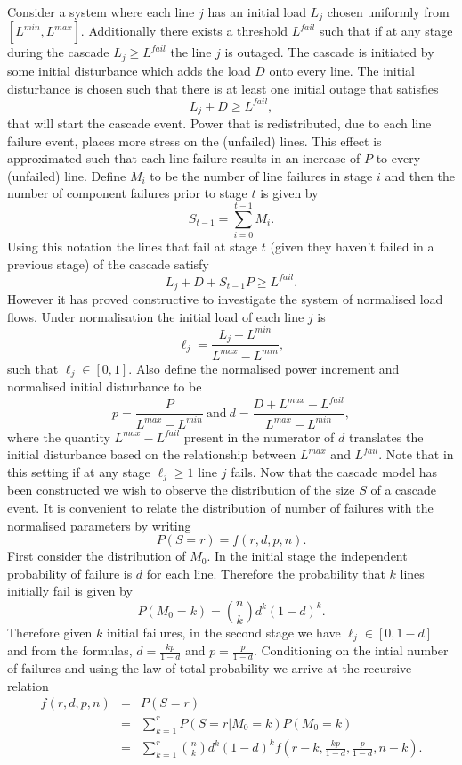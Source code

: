 \documentclass{article}
\renewcommand{\l}{\ell}
\begin{document}
Consider a system where each line $j$ has an initial load $L_j$ chosen uniformly from $[L^{min}, L^{max}]$. Additionally there exists a threshold $L^{fail}$ such that if at any stage during the cascade $L_j\ge L^{fail}$ the line $j$ is outaged. The cascade is initiated by some initial disturbance which adds the load $D$ onto every line. The initial disturbance is chosen such that there is at least one initial outage that satisfies
\[ L_j + D \ge L^{fail},\]
that will start the cascade event. Power that is redistributed, due to each line failure event, places more stress on the (unfailed) lines. This effect is approximated such that each line failure results in an increase of $P$ to every (unfailed) line. Define $M_i$ to be the number of line failures in stage $i$ and then the number of component failures prior to stage $t$ is given by
\[S_{t-1} = \sum_{i=0}^{t-1} M_i.\]
Using this notation the lines that fail at stage $t$ (given they haven't failed in a previous stage) of the cascade satisfy
\[ L_j+D+S_{t-1}P \ge L^{fail}.\]
However it has proved constructive to investigate the system of normalised load flows. Under normalisation the initial load of each line $j$ is 
\[\ell_j = \frac{L_j-L^{min}}{L^{max}-L^{min}},\]
such that $\l_j \in [0,1]$. Also define the normalised power increment and normalised initial disturbance to be
\[p = \frac{P}{L^{max}-L^{min}} \ \text{and} \  d = \frac{D+L^{max}-L^{fail}}{L^{max}-L^{min}},\]
where the quantity $L^{max}-L^{fail}$ present in the numerator of $d$ translates the initial disturbance based on the relationship between $L^{max}$ and $L^{fail}$. Note that in this setting if at any stage $\l_j \ge 1$ line $j$ fails. Now that the cascade model has been constructed we wish to observe the distribution of the size $S$ of a cascade event. It is convenient to relate the distribution of number of failures with the normalised parameters by writing
\[P(S=r) = f(r,d,p,n).\]
 First consider the distribution of $M_0$. In the initial stage the independent probability of failure is $d$ for each line. Therefore the probability that $k$ lines initially fail is given by
\[P(M_0=k) = {n\choose k} d^k(1-d)^k.\]
Therefore given $k$ initial failures, in the second stage we have $\l_j\in [0,1-d]$ and from the formulas, $d = \frac{kp}{1-d}$ and $p = \frac{p}{1-d}$. Conditioning on the intial number of failures and using the law of total probability we arrive at the recursive relation 
\begin{eqnarray*}
f(r,d,p,n) &=& P(S=r)\\
&=& \sum_{k=1}^{r} P(S=r|M_0 = k)P(M_0=k)\\
&=&\sum_{k=1}^{r} {n\choose k} d^k(1-d)^k f(r-k,\frac{kp}{1-d},\frac{p}{1-d}, n-k).
\end{eqnarray*}
\end{document}
